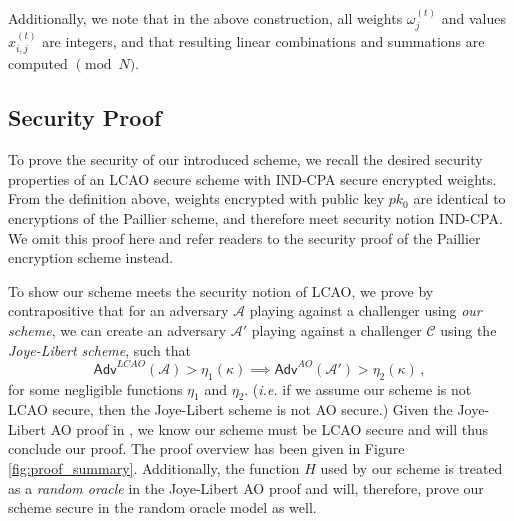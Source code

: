 \documentclass[twocolumn]{autart}
\begin{document}
Additionally, we note that in the above construction, all weights $\omega^{(t)}_j$ and values $x^{(t)}_{i,j}$ are integers, and that resulting linear combinations and summations are computed $\pmod{N}$.

% 
% 

\subsection{Security Proof}
To prove the security of our introduced scheme, we recall the desired security properties of an LCAO secure scheme with IND-CPA secure encrypted weights. From the definition above, weights encrypted with public key $pk_0$ are identical to encryptions of the Paillier scheme, and therefore meet security notion IND-CPA. We omit this proof here and refer readers to the security proof of the Paillier encryption scheme \cite{paillierPublicKeyCryptosystemsBased1999} instead.

To show our scheme meets the security notion of LCAO, we prove by contrapositive that for an adversary $\mathcal{A}$ playing against a challenger using \textit{our scheme}, we can create an adversary $\mathcal{A}'$ playing against a challenger $\mathcal{C}$ using the \textit{Joye-Libert scheme}, such that
\begin{equation*}
    \mathsf{Adv}^{LCAO}(\mathcal{A}) > \eta_1(\kappa) \implies \mathsf{Adv}^{AO}(\mathcal{A}') > \eta_2(\kappa)\,,
\end{equation*}
for some negligible functions $\eta_1$ and $\eta_2$. (\textit{i.e.} if we assume our scheme is not LCAO secure, then the Joye-Libert scheme is not AO secure.) Given the Joye-Libert AO proof in \cite{joyeScalableSchemePrivacyPreserving2013}, we know our scheme must be LCAO secure and will thus conclude our proof. The proof overview has been given in Figure \ref{fig:proof_summary}. Additionally, the function $H$ used by our scheme is treated as a \textit{random oracle} in the Joye-Libert AO proof and will, therefore, prove our scheme secure in the random oracle model as well.
\end{document}
